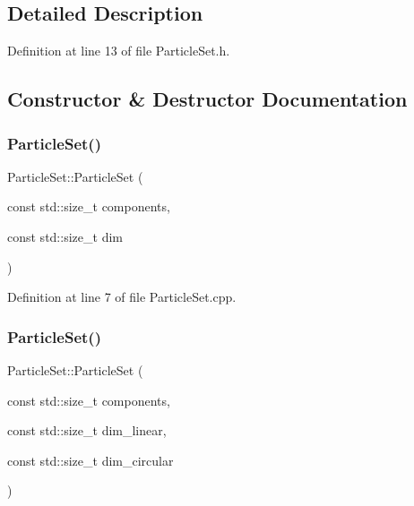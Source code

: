 \subsection{Detailed Description}


Definition at line 13 of file Particle\+Set.\+h.



\subsection{Constructor \& Destructor Documentation}
\mbox{\label{classbfl_1_1ParticleSet_a129747cd8ae551459f3c84e3da6cc537}} 
\subsubsection{\texorpdfstring{Particle\+Set()}{ParticleSet()}\hspace{0.1cm}{\footnotesize\ttfamily [1/2]}}
{\footnotesize\ttfamily Particle\+Set\+::\+Particle\+Set (\begin{DoxyParamCaption}\item[{const std\+::size\+\_\+t}]{components,  }\item[{const std\+::size\+\_\+t}]{dim }\end{DoxyParamCaption})\hspace{0.3cm}{\ttfamily [noexcept]}}



Definition at line 7 of file Particle\+Set.\+cpp.

\mbox{\label{classbfl_1_1ParticleSet_ac8f2c09290542de9732438a77a2afc3a}} 
\subsubsection{\texorpdfstring{Particle\+Set()}{ParticleSet()}\hspace{0.1cm}{\footnotesize\ttfamily [2/2]}}
{\footnotesize\ttfamily Particle\+Set\+::\+Particle\+Set (\begin{DoxyParamCaption}\item[{const std\+::size\+\_\+t}]{components,  }\item[{const std\+::size\+\_\+t}]{dim\+\_\+linear,  }\item[{const std\+::size\+\_\+t}]{dim\+\_\+circular }\end{DoxyParamCaption})\hspace{0.3cm}{\ttfamily [noexcept]}}



